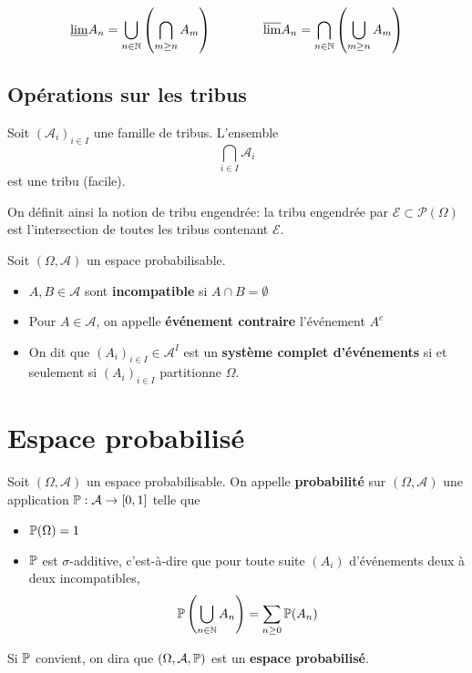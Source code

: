 \begin{notation}[HP]
    \[
        \underline{\lim}A_n=\bigcup_{n\in\N} \left( \bigcap_{m\geq n} A_m \right) \qquad \qquad \overline{\lim} A_n=\bigcap_{n\in\N} \left( \bigcup_{m\geq n}A_m \right) 
    \]
\end{notation}

\subsection{Opérations sur les tribus}

Soit $(\mathcal A_i)_{i\in I}$ une famille de tribus. L'ensemble \[
    \bigcap_{i\in I}\mathcal A_i
\]
est une tribu (facile).

\begin{rem}
    On définit ainsi la notion de tribu engendrée: la tribu engendrée par $\mathcal E\subset \mathcal P(\Omega)$ est l'intersection de toutes les tribus contenant $\mathcal E$.
\end{rem}

\begin{dfn}
    Soit $(\Omega, \mathcal A)$ un espace probabilisable. \begin{itemize}
        \item $A,B\in \mathcal A$ sont \textbf{incompatible} si $A \cap B=\emptyset$
        \item Pour $A\in \mathcal A$, on appelle  \textbf{événement contraire} l'événement $A^c$
        \item On dit que $(A_i)_{i\in I} \in  \mathcal A^I$ est un \textbf{système complet d'événements} si et seulement si $(A_i)_{i\in I}$ partitionne $\Omega$.
    \end{itemize}
\end{dfn}

\section{Espace probabilisé}

\begin{dfn}
    Soit $(\Omega, \mathcal A)$ un espace probabilisable. On appelle \textbf{probabilité} sur $(\Omega, \mathcal A)$ une application $\P:\mathcal A \to  [0, 1]$ telle que \begin{itemize}
        \item $\P(\Omega)=1$
        \item $\P$ est $\sigma$-additive, c'est-à-dire que pour toute suite $(A_i)$ d'événements deux à deux incompatibles, \[
                \P \left( \bigcup_{n\in\N}A_n \right) =\sum_{n\geq 0}\P(A_n)
        \]
    \end{itemize}
    Si $\P$ convient, on dira que $(\Omega, \mathcal A, \P)$ est un \textbf{espace probabilisé}.
\end{dfn}


